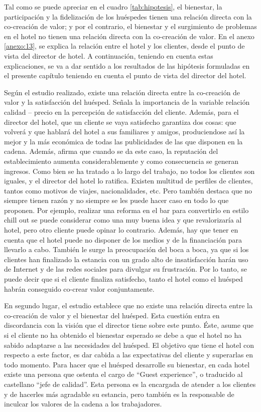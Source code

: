 

Tal como se puede apreciar en el cuadro \ref{tab:hipotesis}, el bienestar, la participación y la fidelización de los huéspedes tienen una relación directa con la co-creación de valor; y por el contrario, el bienestar y el surgimiento de problemas en el hotel no tienen una relación directa con la co-creación de valor. En el anexo \ref{anexo:13}, se explica la relación entre el hotel y los clientes, desde el punto de vista del director de hotel. A continuación, teniendo en cuenta estas explicaciones, se va a dar sentido a los resultados de las hipótesis formuladas en el presente capítulo teniendo en cuenta el punto de vista del director del hotel.

Según el estudio realizado, existe una relación directa entre la co-creación de valor y la satisfacción del huésped. Señala la importancia de la variable relación calidad – precio en la percepción de satisfacción del cliente. Además, para el director del hotel, que un cliente se vaya satisfecho garantiza dos cosas: que volverá y que hablará del hotel a sus familiares y amigos, produciendose así la mejor y la más económica de todas las publicidades de las que disponen en la cadena. Además, afirma que cuando se da este caso, la reputación del establecimiento aumenta considerablemente y como consecuencia se generan ingresos. Como bien se ha tratado a lo largo del trabajo, no todos los clientes son iguales, y el director del hotel lo ratifica. Existen multitud de perfiles de clientes, tantos como motivos de viajes, nacionalidades, etc. Pero también destaca que no siempre tienen razón y no siempre se les puede hacer caso en todo lo que proponen. Por ejemplo, realizar una reforma en el bar para convertirlo en estilo chill out se puede considerar como una muy buena idea y que revalorizaría al hotel, pero otro cliente puede opinar lo contrario. Además, hay que tener en cuenta que el hotel puede no disponer de los medios y de la financiación para llevarlo a cabo. También le surge la preocupación del boca a boca, ya que si los clientes han finalizado la estancia con un grado alto de insatisfacción harán uso de Internet y de las redes sociales para divulgar su frustración. Por lo tanto, se puede decir que si el cliente finaliza satisfecho, tanto el hotel como el huésped habrán conseguido co-crear valor conjuntamente.

En segundo lugar, el estudio establece que no existe una relación directa entre la co-creación de valor y el bienestar del huésped. Esta cuestión entra en discordancia con la visión que el director tiene sobre este punto. Éste, asume que si el cliente no ha obtenido el bienestar esperado se debe a que el hotel no ha sabido adaptarse a las necesidades del huésped. El objetivo que tiene el hotel con respecto a este factor, es dar cabida a las expectativas del cliente y superarlas en todo momento. Para hacer que el huésped desarrolle su bienestar, en cada hotel existe una persona que ostenta el cargo de “Guest experience”, o traducido al castellano “jefe de calidad”. Esta persona es la encargada de atender a los clientes y de hacerles más agradable su estancia, pero también es la responsable de inculcar los valores de la cadena a los trabajadores.

